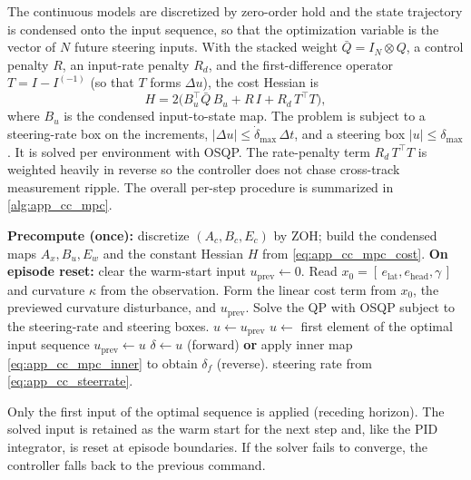 The continuous models are discretized by zero-order hold and the state trajectory is
condensed onto the input sequence, so that the optimization variable is the vector of
$N$ future steering inputs. With the stacked weight $\bar{Q} = I_N \otimes Q$, a control
penalty $R$, an input-rate penalty $R_d$, and the first-difference operator
$T = I - I^{(-1)}$ (so that $T$ forms $\Delta u$), the cost Hessian is
\begin{equation}
    H = 2\bigl(B_u^\top \bar{Q}\, B_u + R\, I + R_d\, T^\top T\bigr),
    \label{eq:app_cc_mpc_cost}
\end{equation}
where $B_u$ is the condensed input-to-state map. The problem is subject to a steering-rate
box on the increments, $\lvert \Delta u \rvert \le \dot{\delta}_{\max}\,\Delta t$, and a
steering box $\lvert u \rvert \le \delta_{\max}$. It is solved per environment with OSQP.
The rate-penalty term $R_d\,T^\top T$ is weighted heavily in reverse so the controller
does not chase cross-track measurement ripple. The overall per-step procedure is
summarized in \cref{alg:app_cc_mpc}.

\begin{algorithm}[H]
\caption{Kinematic LTV MPC step (per environment)}
\label{alg:app_cc_mpc}
\begin{algorithmic}[1]
\State \textbf{Precompute (once):} discretize $(A_c, B_c, E_c)$ by ZOH; build the
condensed maps $A_x, B_u, E_w$ and the constant Hessian $H$ from \eqref{eq:app_cc_mpc_cost}.
\State \textbf{On episode reset:} clear the warm-start input $u_{\text{prev}} \gets 0$.
\State Read $x_0 = [\,e_{\mathrm{lat}}, e_{\mathrm{head}}, \gamma\,]$ and curvature $\kappa$
from the observation.
\State Form the linear cost term from $x_0$, the previewed curvature disturbance, and
$u_{\text{prev}}$.
\State Solve the QP with OSQP subject to the steering-rate and steering boxes.
 $u \gets u_{\text{prev}}$ 
\Else{} $u \gets$ first element of the optimal input sequence
\EndIf
\State $u_{\text{prev}} \gets u$
\State $\delta \gets u$ (forward) \textbf{or} apply inner map \eqref{eq:app_cc_mpc_inner}
to obtain $\delta_f$ (reverse).
\State \Return steering rate from \eqref{eq:app_cc_steerrate}.
\end{algorithmic}
\end{algorithm}

Only the first input of the optimal sequence is applied (receding horizon). The solved
input is retained as the warm start for the next step and, like the PID integrator, is
reset at episode boundaries. If the solver fails to converge, the controller falls back to
the previous command.

